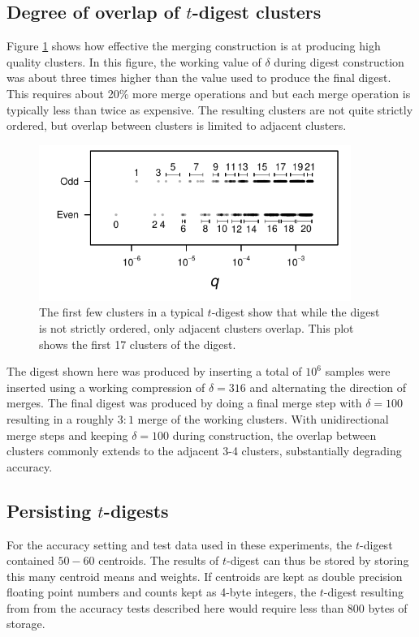 \documentclass[11pt]{amsart}
\begin{document}
\subsection{Degree of overlap of $t$-digest clusters}
Figure \ref{fig:cluster-spread} shows how effective the merging construction is at producing high quality clusters. In this figure, the working value of $\delta$ during digest construction was about three times higher than the value used to produce the final digest. This requires about 20\% more merge operations and but each merge operation is typically less than twice as expensive. The resulting clusters are not quite strictly ordered, but overlap between clusters is limited to adjacent clusters.
\begin{figure}[htb] %
   \includegraphics[width=4in]{cluster-spread.pdf} 
   \caption{The first few clusters in a typical $t$-digest show that while the digest is not strictly ordered, only adjacent clusters overlap. This plot shows the first 17 clusters of the digest. }
   \label{fig:cluster-spread}
\end{figure}
The digest shown here was produced by inserting 
a total of $10^6$ samples were inserted using a working compression of $\delta = 316$ and alternating the direction of merges. The final digest was produced by doing a final merge step with $\delta = 100$ resulting in a roughly $3:1$ merge of the working clusters. With unidirectional merge steps and keeping $\delta=100$ during construction, the overlap between clusters commonly extends to the adjacent 3-4 clusters, substantially degrading accuracy.

\subsection{Persisting $t$-digests}
For the accuracy setting and test data used in these experiments, the $t$-digest contained $50-60$ centroids.  The results of $t$-digest can thus be stored by storing this many centroid means and weights.  If centroids are kept as double precision floating point numbers and counts kept as 4-byte integers, the $t$-digest resulting from from the accuracy tests described here would require less than 800 bytes of storage.
\end{document}
